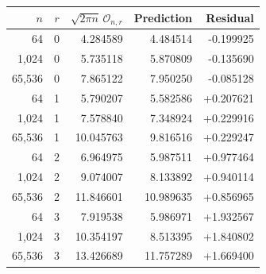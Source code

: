 \begin{tabular}{rrrrr}
\toprule
$n$ & $r$ & $\sqrt{2\pi n}\,\mathcal O_{n,r}$ & Prediction & Residual\\
\midrule
64 & 0 & 4.284589 & 4.484514 & -0.199925 \\
1,024 & 0 & 5.735118 & 5.870809 & -0.135690 \\
65,536 & 0 & 7.865122 & 7.950250 & -0.085128 \\
64 & 1 & 5.790207 & 5.582586 & +0.207621 \\
1,024 & 1 & 7.578840 & 7.348924 & +0.229916 \\
65,536 & 1 & 10.045763 & 9.816516 & +0.229247 \\
64 & 2 & 6.964975 & 5.987511 & +0.977464 \\
1,024 & 2 & 9.074007 & 8.133892 & +0.940114 \\
65,536 & 2 & 11.846601 & 10.989635 & +0.856965 \\
64 & 3 & 7.919538 & 5.986971 & +1.932567 \\
1,024 & 3 & 10.354197 & 8.513395 & +1.840802 \\
65,536 & 3 & 13.426689 & 11.757289 & +1.669400 \\
\bottomrule
\end{tabular}
